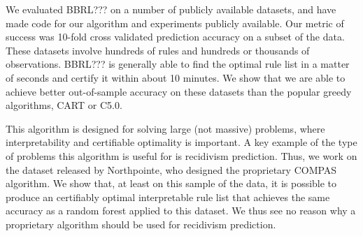 We evaluated BBRL??? on a number of publicly available datasets, and have made code for our algorithm and experiments publicly available. Our metric of success was 10-fold cross validated prediction accuracy on a subset of the data. These datasets involve hundreds of rules and hundreds or thousands of observations. BBRL??? is generally able to find the optimal rule list in a matter of seconds and certify it within about 10 minutes. We show that we are able to achieve better out-of-sample accuracy on these datasets than the popular greedy algorithms, CART or C5.0.

This algorithm is designed for solving large (not massive) problems, where interpretability and certifiable optimality is important. A key example of the type of problems this algorithm is useful for is recidivism prediction. Thus, we work on the dataset released by Northpointe, who designed the proprietary COMPAS algorithm. We show that, at least on this sample of the data, it is possible to produce an certifiably optimal interpretable rule list that achieves the same accuracy as a random forest applied to this dataset. We thus see no reason why a proprietary algorithm should be used for recidivism prediction.

%
%
%
%